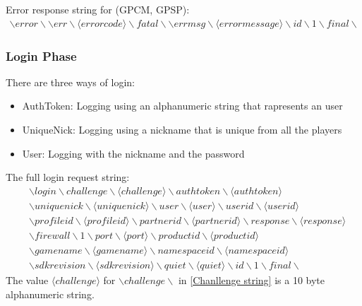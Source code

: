 \documentclass[oneside,titlepage,a4paper]{Definition/retrospy} %
\begin{document}
Error response string for (GPCM, GPSP):
\begin{equation}
\begin{split}
\backslash error \backslash\backslash err \backslash \langle error code \rangle \backslash fatal\backslash\backslash errmsg \backslash \langle error message \rangle \backslash id\backslash 1 \backslash final \backslash
\end{split}	
\end{equation}
\subsubsection{Login Phase}
There are three ways of login:
\begin{itemize}
	\item AuthToken: Logging using an alphanumeric string that rapresents an user
	\item 	UniqueNick: Logging using a nickname that is unique from all the players
	\item User: Logging with the nickname and the password
\end{itemize}

The full login request string:
\begin{equation}\label{Chanllenge string}
\begin{split}
	&\backslash login \backslash challenge \backslash \langle challenge \rangle \backslash authtoken \backslash \langle authtoken \rangle \\& \backslash uniquenick \backslash \langle uniquenick \rangle \backslash user \backslash \langle user \rangle 
	\backslash userid \backslash \langle userid \rangle \\& \backslash profileid \backslash \langle profileid \rangle \backslash partnerid \backslash \langle partnerid \rangle \backslash response \backslash \langle response \rangle \\&
	 \backslash firewall \backslash 1 \backslash port \backslash \langle port \rangle \backslash productid \backslash  \langle productid \rangle \\& \backslash gamename \backslash \langle gamename \rangle \backslash namespaceid \backslash \langle namespaceid \rangle \\& \backslash  sdkrevision \backslash \langle sdkrevision \rangle \backslash quiet \backslash \langle quiet \rangle \backslash id \backslash 1 \backslash final \backslash
\end{split}
\end{equation}
The value $ \langle challenge \rangle $ for $ \backslash challenge \backslash $ in \ref{Chanllenge string} is a 10 byte alphanumeric string.
\end{document}

